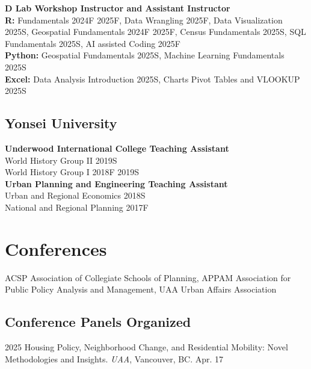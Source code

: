 \documentclass[10pt,letterpaper]{article}
\begin{document}
\textbf{D Lab  Workshop Instructor and Assistant Instructor}\\[0.3em]
\textbf{R:} Fundamentals 2024F 2025F, Data Wrangling 2025F, Data Visualization 2025S, Geospatial Fundamentals 2024F 2025F, Census Fundamentals 2025S, SQL Fundamentals 2025S, AI assisted Coding 2025F\\[0.3em]
\textbf{Python:} Geospatial Fundamentals 2025S, Machine Learning Fundamentals 2025S\\[0.3em]
\textbf{Excel:} Data Analysis Introduction 2025S, Charts Pivot Tables and VLOOKUP 2025S

\subsection{Yonsei University}
\textbf{Underwood International College  Teaching Assistant}\\[0.3em]
World History Group II 2019S\\
World History Group I 2018F 2019S\\[0.6em]
\textbf{Urban Planning and Engineering  Teaching Assistant}\\[0.3em]
Urban and Regional Economics 2018S\\
National and Regional Planning 2017F

\section{Conferences}

ACSP Association of Collegiate Schools of Planning, APPAM Association for Public Policy Analysis and Management, UAA Urban Affairs Association

\subsection{Conference Panels Organized}
\begin{tablist}
  \item[2025] \tab{}Housing Policy, Neighborhood Change, and Residential Mobility: Novel Methodologies and Insights. \emph{UAA}, Vancouver, BC. Apr. 17
\end{tablist}
\end{document}
